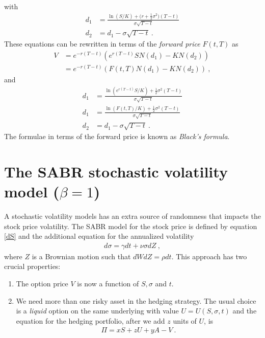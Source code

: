 \documentclass[10pt]{article}
\numberwithin{equation}{section}
\begin{document}
with
\begin{equation*}
	\begin{split}
	d_1 &= \frac{\ln(S/K)+\bigl(r+\frac{1}{2} \sigma^2\bigr)(T-t)}{\sigma \sqrt{T-t}}\\
	d_2 &= d_1 - \sigma \sqrt{T-t}\:.
	\end{split}
\end{equation*}
These equations can be rewritten in terms of the \emph{forward price} $F(t,T)$ as
\begin{equation}
	\begin{split}
	V &= e^{-r(T-t)}(e^{r(T-t)}S N(d_1) - K N(d_2))\\
	   &= e^{-r(T-t)}(F(t,T) N(d_1) - K N(d_2))\:,
	\end{split}
\end{equation}
and
\begin{equation}
	\begin{split}
	d_1 &= \frac{\ln(e^{r(T-t)}S/K)+\frac{1}{2} \sigma^2(T-t)}{\sigma \sqrt{T-t}}\\
	d_1 &= \frac{\ln(F(t,T)/K)+\frac{1}{2} \sigma^2(T-t)}{\sigma \sqrt{T-t}}\\
	d_2 &= d_1 - \sigma \sqrt{T-t}\:.
	\end{split}
\end{equation}
The formulae in terms of the forward price is known as \emph{Black's formula}.

\section{The SABR stochastic volatility model ($\beta=1$)}
A stochastic volatility models has an extra source of randomness that impacts the stock price volatility. The SABR model for the stock price is defined by equation \eqref{dS} and the additional equation for the annualized volatility
\begin{equation}\label{dsigma}
	\begin{split}
	d\sigma = \gamma dt + \nu \sigma dZ \:,
	\end{split}
\end{equation}
where $Z$ is a Brownian motion such that $dWdZ=\rho dt$. This approach has two crucial properties:
\begin{enumerate}
\item The option price $V$ is now a function of $S,\sigma$ and $t$.
\item We need more than one risky asset in the hedging strategy. The usual choice is a \emph{liquid} option on the same underlying with value $U=U(S,\sigma,t)$ and the equation for the hedging portfolio, after we add $z$ units of $U$, is
\begin{equation*}
	\begin{split}
	\Pi = x S + z U + y A - V\:.
	\end{split}
\end{equation*}
\end{enumerate}
\end{document}
